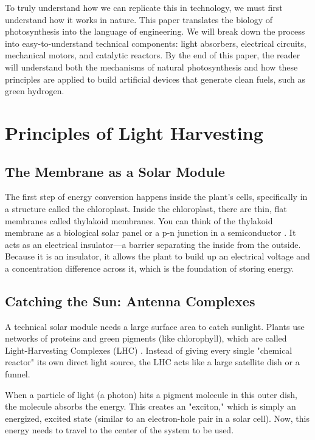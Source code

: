 \documentclass[conference]{IEEEtran}
\begin{document}
To truly understand how we can replicate this in technology, we must first understand how it works in nature. This paper translates the biology of photosynthesis into the language of engineering. We will break down the process into easy-to-understand technical components: light absorbers, electrical circuits, mechanical motors, and catalytic reactors. By the end of this paper, the reader will understand both the mechanisms of natural photosynthesis and how these principles are applied to build artificial devices that generate clean fuels, such as green hydrogen.

\section{Principles of Light Harvesting}
\subsection{The Membrane as a Solar Module}
The first step of energy conversion happens inside the plant's cells, specifically in a structure called the chloroplast. Inside the chloroplast, there are thin, flat membranes called thylakoid membranes. You can think of the thylakoid membrane as a biological solar panel or a p-n junction in a semiconductor \cite{gustSolarFuelsArtificial2009}. It acts as an electrical insulator—a barrier separating the inside from the outside. Because it is an insulator, it allows the plant to build up an electrical voltage and a concentration difference across it, which is the foundation of storing energy.

\subsection{Catching the Sun: Antenna Complexes}
A technical solar module needs a large surface area to catch sunlight. Plants use networks of proteins and green pigments (like chlorophyll), which are called Light-Harvesting Complexes (LHC) \cite{scholesLessonsNatureSolar2011}. Instead of giving every single "chemical reactor" its own direct light source, the LHC acts like a large satellite dish or a funnel. 

When a particle of light (a photon) hits a pigment molecule in this outer dish, the molecule absorbs the energy. This creates an "exciton," which is simply an energized, excited state (similar to an electron-hole pair in a solar cell). Now, this energy needs to travel to the center of the system to be used. 
\end{document}
